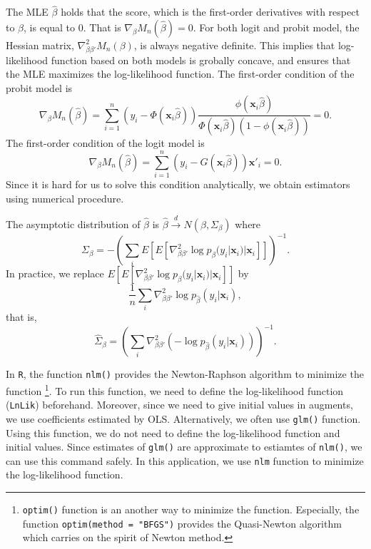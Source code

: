 \documentclass[
  12pt,
]{article}
\begin{document}
The MLE \(\hat{\beta}\) holds that the score, which is the first-order
derivatives with respect to \(\beta\), is equal to 0. That is
\(\nabla_{\beta} M_n(\hat{\beta}) = 0\). For both logit and probit
model, the Hessian matrix, \(\nabla^2_{\beta\beta'} M_n(\beta)\), is
always negative definite. This implies that log-likelihood function
based on both models is grobally concave, and ensures that the MLE
maximizes the log-likelihood function. The first-order condition of the
probit model is \begin{equation*}
  \nabla_{\beta} M_n(\hat{\beta}) 
  = \sum_{i = 1}^n \left( y_i - \Phi(\mathbf{x}_i \hat{\beta}) \right) 
  \frac{\phi(\mathbf{x}_i \hat{\beta})}{\Phi(\mathbf{x}_i \hat{\beta})(1 - \phi(\mathbf{x}_i \hat{\beta}))} = 0.
\end{equation*} The first-order condition of the logit model is
\begin{equation*}
  \nabla_{\beta} M_n(\hat{\beta}) 
  = \sum_{i = 1}^n \left( y_i - G(\mathbf{x}_i \hat{\beta}) \right) \mathbf{x}'_i = 0.
\end{equation*} Since it is hard for us to solve this condition
analytically, we obtain estimators using numerical procedure.

The asymptotic distribution of \(\hat{\beta}\) is
\(\hat{\beta} \overset{d}{\to} N(\beta, \Sigma_{\beta})\) where
\begin{equation*}
  \Sigma_{\beta} = - \left( \sum_i E[E[ \nabla^2_{\beta\beta'} \log p_{\beta}(y_i | \mathbf{x}_i) | \mathbf{x}_i ]] \right)^{-1}.
\end{equation*} In practice, we replace
\(E[E[ \nabla^2_{\beta\beta'} \log p_{\beta}(y_i | \mathbf{x}_i) | \mathbf{x}_i ]]\)
by \begin{equation*}
  \frac{1}{n} \sum_i \nabla^2_{\beta\beta'} \log p_{\hat{\beta}}(y_i | \mathbf{x}_i),
\end{equation*} that is, \begin{equation*}
  \hat{\Sigma}_{\beta} = \left( \sum_i \nabla^2_{\beta\beta'} (-\log p_{\hat{\beta}}(y_i | \mathbf{x}_i)) \right)^{-1}.
\end{equation*}

In \texttt{R}, the function \texttt{nlm()} provides the Newton-Raphson
algorithm to minimize the function \footnote{\texttt{optim()} function
  is an another way to minimize the function. Especially, the function
  \texttt{optim(method\ =\ "BFGS")} provides the Quasi-Newton algorithm
  which carries on the spirit of Newton method.}. To run this function,
we need to define the log-likelihood function (\texttt{LnLik})
beforehand. Moreover, since we need to give initial values in augments,
we use coefficients estimated by OLS. Alternatively, we often use
\texttt{glm()} function. Using this function, we do not need to define
the log-likelihood function and initial values. Since estimates of
\texttt{glm()} are approximate to estiamtes of \texttt{nlm()}, we can
use this command safely. In this application, we use \texttt{nlm}
function to minimize the log-likelihood function.
\end{document}
